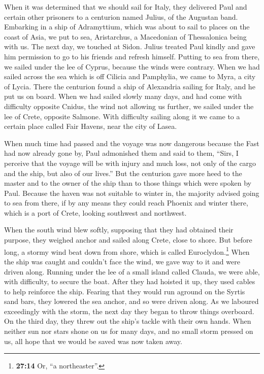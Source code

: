  When it was determined that we should sail for Italy,
they delivered Paul and certain other prisoners to a centurion named
Julius, of the Augustan band.  Embarking in a ship of
Adramyttium, which was about to sail to places on the coast of Asia, we
put to sea, Aristarchus, a Macedonian of Thessalonica being with us.
 The next day, we touched at Sidon. Julius treated Paul
kindly and gave him permission to go to his friends and refresh himself.
 Putting to sea from there, we sailed under the lee of
Cyprus, because the winds were contrary.  When we had
sailed across the sea which is off Cilicia and Pamphylia, we came to
Myra, a city of Lycia.  There the centurion found a ship
of Alexandria sailing for Italy, and he put us on board. 
When we had sailed slowly many days, and had come with difficulty
opposite Cnidus, the wind not allowing us further, we sailed under the
lee of Crete, opposite Salmone.  With difficulty sailing
along it we came to a certain place called Fair Havens, near the city of
Lasea.

 When much time had passed and the voyage was now
dangerous because the Fast had now already gone by, Paul admonished them
 and said to them, ``Sirs, I perceive that the voyage
will be with injury and much loss, not only of the cargo and the ship,
but also of our lives.''  But the centurion gave more
heed to the master and to the owner of the ship than to those things
which were spoken by Paul.  Because the haven was not
suitable to winter in, the majority advised going to sea from there, if
by any means they could reach Phoenix and winter there, which is a port
of Crete, looking southwest and northwest.

 When the south wind blew softly, supposing that they had
obtained their purpose, they weighed anchor and sailed along Crete,
close to shore.  But before long, a stormy wind beat down
from shore, which is called Euroclydon.\footnote{\textbf{27:14} Or, ``a
  northeaster''.}  When the ship was caught and couldn't
face the wind, we gave way to it and were driven along. 
Running under the lee of a small island called Clauda, we were able,
with difficulty, to secure the boat.  After they had
hoisted it up, they used cables to help reinforce the ship. Fearing that
they would run aground on the Syrtis sand bars, they lowered the sea
anchor, and so were driven along.  As we laboured
exceedingly with the storm, the next day they began to throw things
overboard.  On the third day, they threw out the ship's
tackle with their own hands.  When neither sun nor stars
shone on us for many days, and no small storm pressed on us, all hope
that we would be saved was now taken away.

